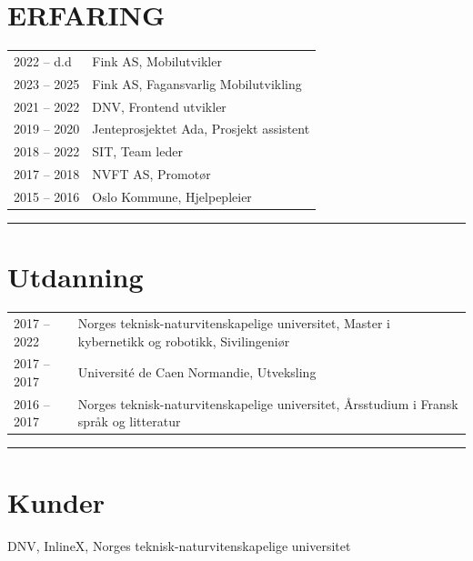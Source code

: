 \documentclass[a4paper,10pt]{article}
\begin{document}
\begin{paracol}{2}
\switchcolumn

\vspace{5em}
\begin{center}
    
\end{center}
\vspace{2em}

 
\section{\ubuntu ERFARING}
\renewcommand{\arraystretch}{1.3} %
\begin{tabularx}{\columnwidth}{@{}lX@{}}
2022 -- d.d & Fink AS, Mobilutvikler \\
2023 -- 2025 & Fink AS, Fagansvarlig Mobilutvikling \\
2021 -- 2022 & DNV, Frontend utvikler \\
2019 -- 2020 & Jenteprosjektet Ada, Prosjekt assistent \\
2018 -- 2022 & SIT, Team leder \\
2017 -- 2018 & NVFT AS, Promotør \\
2015 -- 2016 & Oslo Kommune, Hjelpepleier \\
\end{tabularx}

\vspace{0.5em} 
\noindent\rule{\linewidth}{0.2pt}

\section{\ubuntu Utdanning}
\renewcommand{\arraystretch}{1.3} %
\begin{tabularx}{\columnwidth}{@{}l>{\raggedright\arraybackslash}X@{}}
2017 -- 2022 & Norges teknisk-naturvitenskapelige universitet, Master i kybernetikk og robotikk, Sivilingeniør \\
2017 -- 2017 & Université de Caen Normandie, Utveksling \\
2016 -- 2017 & Norges teknisk-naturvitenskapelige universitet, Årsstudium i Fransk språk og litteratur \\
\end{tabularx}

\vspace{0.5em} 
\noindent\rule{\linewidth}{0.2pt}


\section{\ubuntu Kunder}
DNV, \hspace{0.1em} 
InlineX, \hspace{0.1em} 
Norges teknisk-naturvitenskapelige
universitet


\end{paracol}
\end{document}
